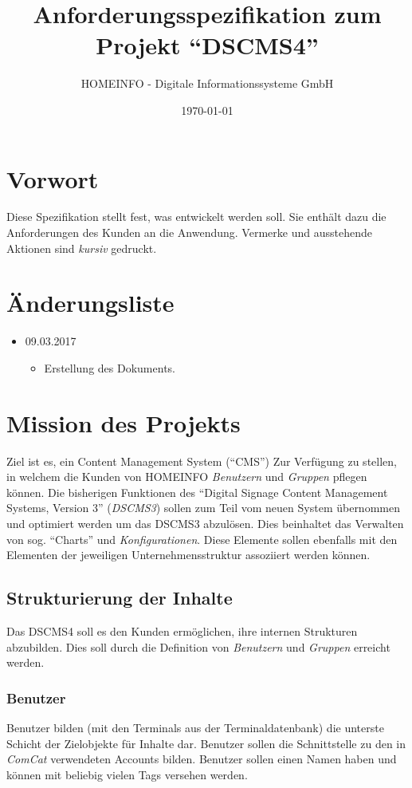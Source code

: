 \documentclass[a4paper]{article}
\title{Anforderungsspezifikation zum Projekt \linebreak \enquote{DSCMS4}}
\author{HOMEINFO - Digitale Informationssysteme GmbH}
\date{\today}
\begin{document}
	
	\maketitle
	\pagebreak
	
	\tableofcontents
	\pagebreak
	
	\section*{Vorwort}
	Diese Spezifikation stellt fest, was entwickelt werden soll. Sie enthält dazu die Anforderungen des Kunden an die Anwendung.
	Vermerke und ausstehende Aktionen sind \emph{kursiv} gedruckt.
	\section*{Änderungsliste}
	\begin{itemize}
		\item 09.03.2017
		\begin{itemize}
			\item Erstellung des Dokuments.
		\end{itemize}
	\end{itemize}
	
	\pagebreak
	\section{Mission des Projekts}
	Ziel ist es, ein Content Management System (\enquote{CMS}) Zur Verfügung zu stellen, in welchem die Kunden von HOMEINFO \emph{Benutzern} und \emph{Gruppen} pflegen können.
	Die bisherigen Funktionen des \enquote{Digital Signage Content Management Systems, Version 3} (\emph{DSCMS3}) sollen zum Teil vom neuen System übernommen und optimiert werden um das DSCMS3 abzulösen.
	Dies beinhaltet das Verwalten von sog. \enquote{Charts} und \emph{Konfigurationen}.
	Diese Elemente sollen ebenfalls mit den Elementen der jeweiligen Unternehmensstruktur assoziiert werden können.
	\subsection{Strukturierung der Inhalte}
	Das DSCMS4 soll es den Kunden ermöglichen, ihre internen Strukturen abzubilden. Dies soll durch die Definition von \emph{Benutzern} und \emph{Gruppen} erreicht werden.
	\subsubsection{Benutzer}
	Benutzer bilden (mit den Terminals aus der Terminaldatenbank) die unterste Schicht der Zielobjekte für Inhalte dar. Benutzer sollen die Schnittstelle zu den in \emph{ComCat} verwendeten Accounts bilden.
	Benutzer sollen einen Namen haben und können mit beliebig vielen Tags versehen werden.
\end{document}
